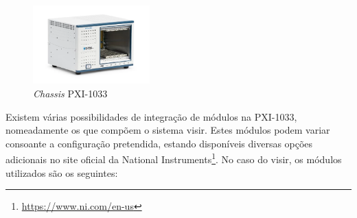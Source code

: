 \begin{figure}[hbtp]
    \centering
    \includegraphics[width=0.4\textwidth]{figures/PXI-1033.png}
    \caption{\textit{Chassis} PXI-1033 \cite{PXI-1033}}
    \label{fig:PXI-1033}
\end{figure}

Existem várias possibilidades de integração de módulos na PXI-1033, nomeadamente os que compõem o sistema \acrshort{visir}. Estes módulos podem variar consoante a configuração pretendida, estando disponíveis diversas opções adicionais no site oficial da National Instruments\footnote{\url{https://www.ni.com/en-us}}. No caso do \acrshort{visir}, os módulos utilizados são os seguintes:
